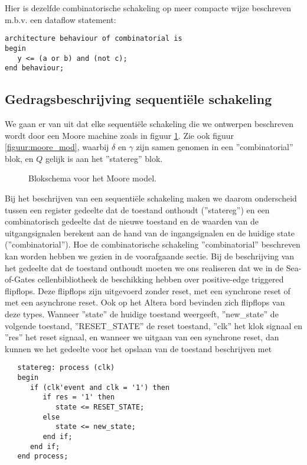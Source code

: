 Hier is dezelfde combinatorische schakeling
op meer compacte wijze beschreven m.b.v. een dataflow statement:
\begin{verbatim}
architecture behaviour of combinatorial is
begin
   y <= (a or b) and (not c);
end behaviour;
\end{verbatim}

\subsection{Gedragsbeschrijving sequenti\"ele schakeling}

We gaan er van uit dat elke sequenti\"ele schakeling die we
ontwerpen beschreven wordt door een Moore machine 
zoals in figuur \ref{figuur:vhdlfsm}.
Zie ook figuur \ref{figuur:moore_mod}, waarbij $\delta$ en $\gamma$
zijn samen genomen in een ''combinatorial'' blok, en $Q$ gelijk is
aan het ''statereg'' blok.
\begin{figure}[bth]
\centerline{}
\caption{Blokschema voor het Moore model.}
\label{figuur:vhdlfsm}
\end{figure}
Bij het beschrijven van een sequenti\"ele schakeling maken we daarom 
onderscheid tussen een register gedeelte dat 
de toestand onthoudt (''statereg'') en een combinatorisch gedeelte dat 
de nieuwe toestand en de waarden van de uitgangsignalen berekent aan de hand
van de ingangsignalen en de huidige state (''combinatorial'').
Hoe de combinatorische schakeling ''combinatorial'' beschreven kan worden 
hebben we gezien in de voorafgaande sectie. 
Bij de beschrijving van het gedeelte dat de toestand onthoudt
moeten we ons realiseren dat we in de Sea-of-Gates cellenbibliotheek
de beschikking hebben over positive-edge triggered flipflops.
Deze flipflops zijn uitgevoerd zonder reset, met een synchrone
reset of met een asynchrone reset.
Ook op het Altera bord bevinden zich flipflops van deze types.
Wanneer ''state'' de huidige toestand weergeeft, ''new\_state''
de volgende toestand, ''RESET\_STATE'' de reset toestand, ''clk''
het klok signaal en ''res'' het reset signaal, en wanneer we
uitgaan van een synchrone reset, dan kunnen
we het gedeelte voor het opslaan van de toestand beschrijven met
\begin{verbatim}
   statereg: process (clk)
   begin
      if (clk'event and clk = '1') then
         if res = '1' then
            state <= RESET_STATE;
         else
            state <= new_state;
         end if;
      end if;
   end process;
\end{verbatim}

